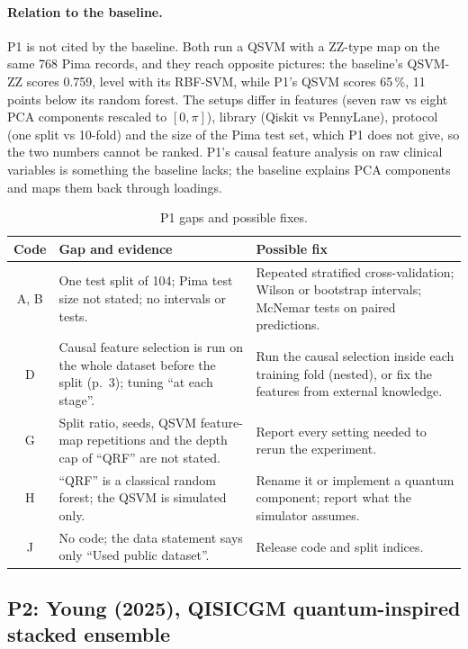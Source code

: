 \documentclass[11pt,a4paper]{article}
\begin{document}
\paragraph{Relation to the baseline.} P1 is not cited by the baseline. Both run a QSVM with a ZZ-type map on the same 768 Pima records, and they reach opposite pictures: the baseline's QSVM-ZZ scores 0.759, level with its RBF-SVM, while P1's QSVM scores 65\,\%, 11 points below its random forest. The setups differ in features (seven raw vs eight PCA components rescaled to $[0,\pi]$), library (Qiskit vs PennyLane), protocol (one split vs 10-fold) and the size of the Pima test set, which P1 does not give, so the two numbers cannot be ranked. P1's causal feature analysis on raw clinical variables is something the baseline lacks; the baseline explains PCA components and maps them back through loadings.

\begin{table}[H]
\centering\footnotesize
\caption{P1 gaps and possible fixes.}
\begin{tabularx}{\textwidth}{c Y Y}
\toprule
Code & Gap and evidence & Possible fix \\
\midrule
A, B & One test split of 104; Pima test size not stated; no intervals or tests. & Repeated stratified cross-validation; Wilson or bootstrap intervals; McNemar tests on paired predictions. \\
D & Causal feature selection is run on the whole dataset before the split (p.~3); tuning ``at each stage''. & Run the causal selection inside each training fold (nested), or fix the features from external knowledge. \\
G & Split ratio, seeds, QSVM feature-map repetitions and the depth cap of ``QRF'' are not stated. & Report every setting needed to rerun the experiment. \\
H & ``QRF'' is a classical random forest; the QSVM is simulated only. & Rename it or implement a quantum component; report what the simulator assumes. \\
J & No code; the data statement says only ``Used public dataset''. & Release code and split indices. \\
\bottomrule
\end{tabularx}
\end{table}

\subsection{P2: Young (2025), QISICGM quantum-inspired stacked ensemble}
\label{sec:p2}
\end{document}
